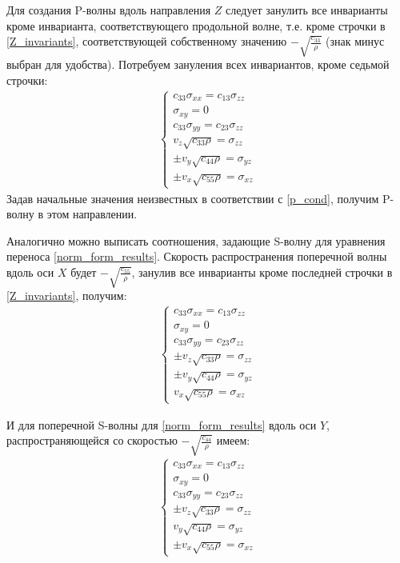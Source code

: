	Для создания P-волны вдоль направления $Z$ следует занулить все инварианты кроме инварианта, соответствующего продольной волне, т.е. кроме строчки в \eqref{Z_invariants}, соответствующей собственному значению $-\sqrt{\frac{c_{33}}{\rho}}$ (знак минус выбран для удобства).
	Потребуем зануления всех инвариантов, кроме седьмой строчки:
\begin{align}	
	\label{p_cond}
	\left\{
		\begin{array}{cccccccccccc}
			c_{33}\sigma_{xx} = c_{13}\sigma_{zz} \\
			\sigma_{xy} = 0 \\
			c_{33}\sigma_{yy} = c_{23}\sigma_{zz} \\
			v_z\sqrt{c_{33}\rho} = \sigma_{zz} \\
			\pm v_y\sqrt{c_{44}\rho} = \sigma_{yz} \\
			\pm v_x\sqrt{c_{55}\rho} = \sigma_{xz}
		\end{array}
	\right.
\end{align}
	Задав начальные значения неизвестных в соответствии с \eqref{p_cond}, получим P-волну в этом направлении.
	
	Аналогично можно выписать соотношения, задающие S-волну для уравнения переноса \eqref{norm_form_results}.
	Скорость распространения поперечной волны вдоль оси $X$ будет $-\sqrt{\frac{c_{55}}{\rho}}$, занулив все инварианты кроме последней строчки в \eqref{Z_invariants}, получим:
\begin{align}	
	\label{s_cond1}
	\left\{
		\begin{array}{cccccccccccc}
			c_{33}\sigma_{xx} = c_{13}\sigma_{zz} \\
			\sigma_{xy} = 0 \\
			c_{33}\sigma_{yy} = c_{23}\sigma_{zz} \\
			\pm v_z\sqrt{c_{33}\rho} = \sigma_{zz} \\
			\pm v_y\sqrt{c_{44}\rho} = \sigma_{yz} \\
			v_x\sqrt{c_{55}\rho} = \sigma_{xz}
		\end{array}
	\right.
\end{align}

	И для поперечной S-волны для \eqref{norm_form_results} вдоль оси $Y$, распространяющейся со скоростью $-\sqrt{\frac{c_{44}}{\rho}}$ имеем:
\begin{align}	
	\label{s_cond2}
	\left\{
		\begin{array}{cccccccccccc}
			c_{33}\sigma_{xx} = c_{13}\sigma_{zz} \\
			\sigma_{xy} = 0 \\
			c_{33}\sigma_{yy} = c_{23}\sigma_{zz} \\
			\pm v_z\sqrt{c_{33}\rho} = \sigma_{zz} \\
			v_y\sqrt{c_{44}\rho} = \sigma_{yz} \\
			\pm v_x\sqrt{c_{55}\rho} = \sigma_{xz}
		\end{array}
	\right.
\end{align}

